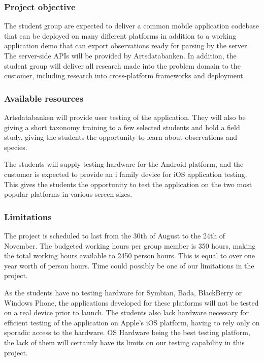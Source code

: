 \subsubsection{Project objective}
The student group are expected to deliver a common mobile application codebase
that can be deployed on many different platforms in addition to a working
application demo that can export observations ready for parsing by the server.
The server-side APIs will be provided by Artsdatabanken. In addition, the
student group will deliver all research made into the problem domain to the
customer, including research into cross-platform frameworks and deployment.

\subsubsection{Available resources}
Artsdatabanken will provide user testing of the application. They will also be giving a short taxonomy training to a few selected students and hold a field study, giving the
students the opportunity to learn about observations and species.

The students will supply testing hardware for the Android platform, and the customer is expected to provide an i family device for iOS application testing. This gives the students the opportunity to test
the application on the two most popular platforms in various screen sizes.

\subsubsection{Limitations}
The project is scheduled to last from the 30th of August to the 24th of
November. The budgeted working hours per group member is 350 hours, making the
total working hours available to 2450  person hours. This is equal to over one
year worth of person hours. Time could possibly be one of our limitations in the project.

As the students have no testing hardware for Symbian, Bada, BlackBerry or
Windows Phone, the applications developed for these platforms will not be
tested on a real device prior to launch. The students also lack hardware
necessary for efficient testing of the application on Apple's iOS platform, having to rely only on sporadic
access to the hardware. OS Hardware being the best testing platform, the lack of them will certainly have its limits on our testing capability in this project.

